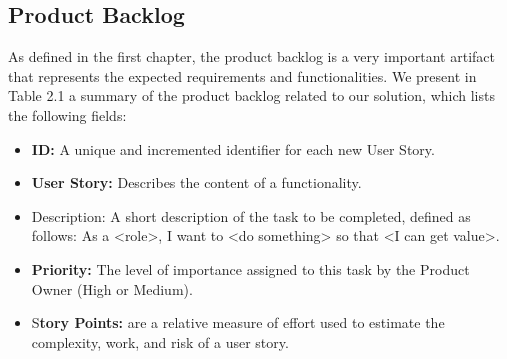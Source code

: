 \subsection{Product Backlog}
As defined in the first chapter, the product backlog is a very important artifact that represents the expected requirements and functionalities.  
We present in Table 2.1 a summary of the product backlog related to our solution, which lists the following fields:

\begin{itemize}
    \item \textbf{ID:} A unique and incremented identifier for each new User Story.
    \item \textbf{User Story:} Describes the content of a functionality.
    \item Description: A short description of the task to be completed, defined as follows: As a <role>, I want to <do something> so that <I can get value>.
    \item \textbf{Priority:} The level of importance assigned to this task by the Product Owner (High or Medium).
    \item S\textbf{tory Points:} are a relative measure of effort used to estimate the complexity, work, and risk of a user story.
\end{itemize}


